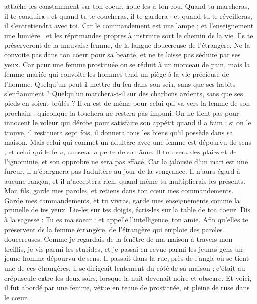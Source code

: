 \begin{multicols}{2}
attache-les constamment sur ton coeur, noue-les à ton cou.
Quand tu marcheras, il te conduira ; et quand tu te coucheras, il te gardera ; et quand tu te réveilleras, il s'entretiendra avec toi.
Car le commandement est une lampe ; et l'enseignement une lumière ; et les réprimandes propres à instruire sont le chemin de la vie.
Ils te préserveront de la mauvaise femme, de la langue doucereuse de l’étrangère.
Ne la convoite pas dans ton coeur pour sa beauté, et ne te laisse pas séduire par ses yeux.
Car pour une femme prostituée on se réduit à un morceau de pain, mais la femme mariée qui convoite les hommes tend un piège à la vie précieuse de l’homme.
Quelqu'un peut-il mettre du feu dans son sein, sans que ses habits s’enflamment ?
Quelqu'un marchera-t-il sur des charbons ardents, sans que ses pieds en soient brûlés ?
Il en est de même pour celui qui va vers la femme de son prochain ; quiconque la touchera ne restera pas impuni.
On ne tient pas pour innocent le voleur qui dérobe pour satisfaire son appétit quand il a faim ;
si on le trouve, il restituera sept fois, il donnera tous les biens qu'il possède dans sa maison.
Mais celui qui commet un adultère avec une femme est dépourvu de sens ; et celui qui le fera, causera la perte de son âme.
Il trouvera des plaies et de l’ignominie, et son opprobre ne sera pas effacé.
Car la jalousie d’un mari est une fureur, il n'épargnera pas l'adultère au jour de la vengeance.
Il n'aura égard à aucune rançon, et il n'acceptera rien, quand même tu multiplierais les présents.
\TextTitle{[La prostituée]}
\VerseOne{}Mon fils, garde mes paroles, et retiens dans ton cœur mes commandements.
Garde mes commandements, et tu vivras, garde mes enseignements comme la prunelle de tes yeux.
Lie-les sur tes doigts, écris-les sur la table de ton coeur.
Dis à la sagesse : Tu es ma soeur ; et appelle l’intelligence, ton amie.
Afin qu'elles te préservent de la femme étrangère, de l’étrangère qui emploie des paroles doucereuses.
Comme je regardais de la fenêtre de ma maison à travers mon treillis,
je vis parmi les stupides, et je passai en revue parmi les jeunes gens un jeune homme dépourvu de sens.
Il passait dans la rue, près de l’angle où se tient une de ces étrangères, il se dirigeait lentement du côté de sa maison ;
c’était au crépuscule entre les deux soirs, lorsque la nuit devenait noire et obscure.
Et voici, il fut abordé par une femme, vêtue en tenue de prostituée, et pleine de ruse dans le cœur.

\end{multicols}
